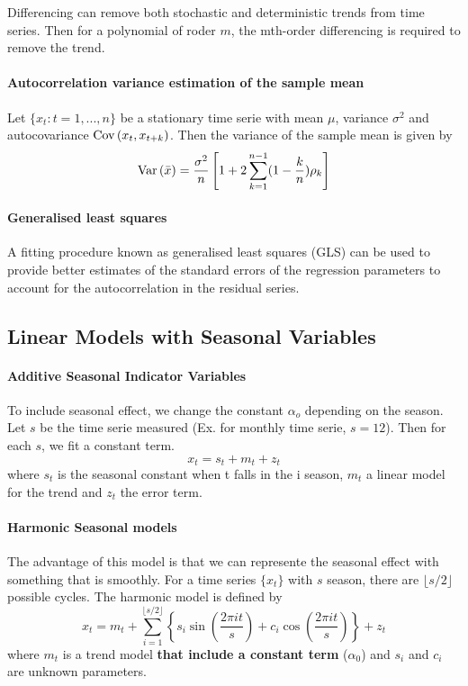 Differencing can remove both stochastic and deterministic trends from time series. Then for a polynomial of roder $m$, the mth-order differencing is required to remove the trend.
\paragraph{Autocorrelation variance estimation of the sample mean}
Let $\{x_t : t = 1,..., n\}$ be a stationary time serie with mean $\mu$, variance $\sigma^2$ and autocovariance $\mathrm{Cov} \left( x_t, x_{t+k} \right)$. Then the variance of the sample mean is given by
\[ \mathrm{Var} \left( \bar{x} \right) = \frac{\sigma^2}{n} \left[ 1 + 2 \sum_{k=1}^{n-1} (1 - \frac{k}{n}) \rho_k \right] \] 

\paragraph{Generalised least squares}
A fitting procedure known as generalised least squares (GLS) can be used to provide better estimates of the standard errors of the regression parameters to account for the autocorrelation in the residual series.

\subsection{Linear Models with Seasonal Variables}

\paragraph{Additive Seasonal Indicator Variables}
To include seasonal effect, we change the constant $\alpha_o$ depending on the season. Let $s$ be the time serie measured (Ex. for monthly time serie, $s=12$). Then for each $s$, we fit a constant term.
\[ x_t = s_t + m_t + z_t \]
where $s_t$ is the seasonal constant when t falls in the i season, $m_t$ a linear model for the trend and $z_t$ the error term.

\paragraph{Harmonic Seasonal models}
The advantage of this model is that we can represente the seasonal effect with something that is smoothly. For a time series $\{x_t\}$ with $s$ season, there are $\lfloor s/2 \rfloor$ possible cycles. The harmonic model is defined by 
\[ x_t = m_t + \sum_{i=1}^{\lfloor s/2 \rfloor} \left\{ s_i \sin(\frac{2\pi it}{s}) + c_i \cos(\frac{2\pi it}{s}) \right\} + z_t \]
where $m_t$ is a trend model \textbf{that include a constant term} ($\alpha_0$) and $s_i$ and $c_i$ are unknown parameters. 

